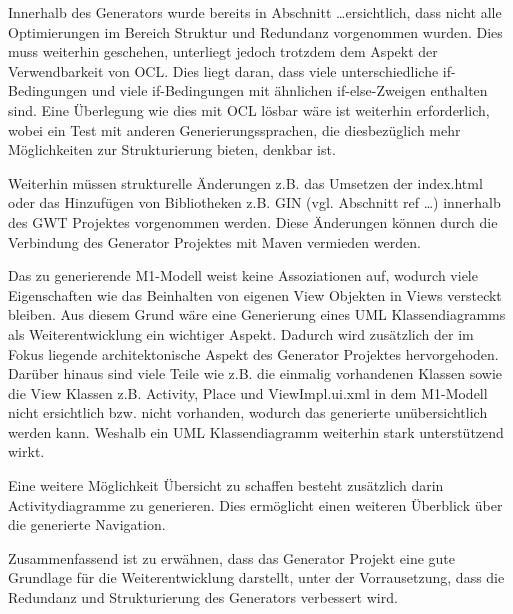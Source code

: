 Innerhalb des Generators wurde bereits in Abschnitt \ldots ersichtlich, dass
nicht alle Optimierungen im Bereich Struktur und Redundanz vorgenommen wurden.
Dies muss weiterhin geschehen, unterliegt jedoch trotzdem dem Aspekt der
Verwendbarkeit von OCL. Dies liegt daran, dass viele
unterschiedliche if-Bedingungen und viele if-Bedingungen mit ähnlichen
if-else-Zweigen enthalten sind. Eine Überlegung wie dies mit OCL lösbar wäre
ist weiterhin erforderlich, wobei ein Test mit anderen Generierungssprachen,
die diesbezüglich mehr Möglichkeiten zur Strukturierung bieten, denkbar ist.

Weiterhin müssen strukturelle Änderungen z.B. das Umsetzen der
index.html oder das Hinzufügen von Bibliotheken z.B. GIN (vgl. Abschnitt ref
\ldots) innerhalb des GWT Projektes vorgenommen werden. Diese Änderungen können
durch die Verbindung des Generator Projektes mit Maven vermieden werden.

Das zu generierende M1-Modell weist keine Assoziationen auf, wodurch viele
Eigenschaften wie das Beinhalten von eigenen View Objekten in Views versteckt
bleiben. Aus diesem Grund wäre eine Generierung eines UML Klassendiagramms als
Weiterentwicklung ein wichtiger Aspekt. Dadurch wird zusätzlich der im Fokus
liegende architektonische Aspekt des Generator Projektes hervorgehoden.
Darüber hinaus sind viele Teile wie z.B. die einmalig vorhandenen Klassen sowie die View
Klassen z.B. Activity, Place und ViewImpl.ui.xml in dem M1-Modell nicht
ersichtlich bzw. nicht vorhanden, wodurch das generierte unübersichtlich werden
kann. Weshalb ein UML Klassendiagramm weiterhin stark unterstützend wirkt. 

Eine weitere Möglichkeit Übersicht zu schaffen besteht zusätzlich darin
Activitydiagramme zu generieren. Dies ermöglicht einen weiteren Überblick über
die generierte Navigation.

Zusammenfassend ist zu erwähnen, dass das Generator Projekt eine gute
Grundlage für die Weiterentwicklung darstellt, unter der Vorrausetzung, dass die
Redundanz und Strukturierung des Generators verbessert wird.